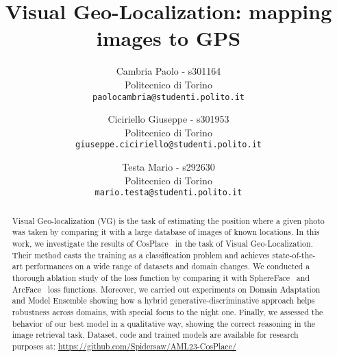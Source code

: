 \documentclass[10pt,twocolumn,letterpaper]{article}
\begin{document}
\title{Visual Geo-Localization:
mapping images to GPS}

\author{Cambria Paolo - s301164\\
Politecnico di Torino\\
{\tt\small paolocambria@studenti.polito.it}
\and
Ciciriello Giuseppe - s301953\\
Politecnico di Torino\\
{\tt\small giuseppe.ciciriello@studenti.polito.it}
\and
Testa Mario - s292630\\
Politecnico di Torino\\
{\tt\small mario.testa@studenti.polito.it}
}

\maketitle

\begin{abstract}
Visual Geo-localization (VG) is the task of estimating the position where a given photo was taken by comparing it with a large database of images of known locations.
In this work, we investigate the results of CosPlace~\cite{Berton_CVPR_2022_CosPlace} in the task of Visual Geo-Localization. Their method casts the training as a classification problem and achieves state-of-the-art performances on a wide range of datasets and domain changes. We conducted a thorough ablation study of the loss function by comparing it with SphereFace~\cite{sphereface} and ArcFace~\cite{arcface} loss functions. Moreover, we carried out experiments on Domain Adaptation and Model Ensemble showing how a hybrid generative-discriminative approach helps robustness across domains, with special focus to the night one.
Finally, we assessed the behavior of our best model in a qualitative way, showing the correct reasoning in the image retrieval task.
Dataset, code and trained models are available for research purposes at: \newline
\url{https://github.com/Spidersaw/AML23-CosPlace/}
\end{abstract}


\end{document}
